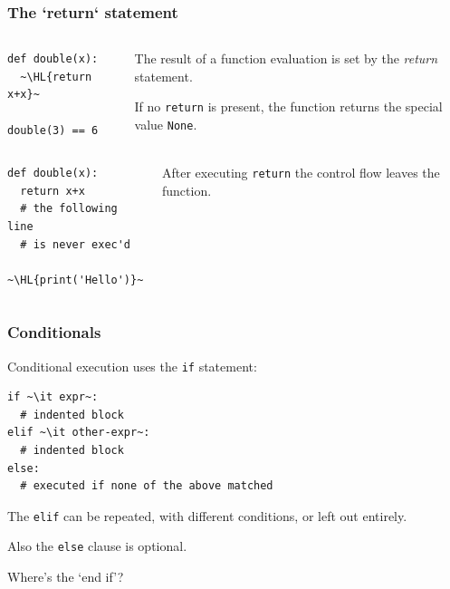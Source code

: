 \documentclass[english,serif,mathserif,xcolor=pdftex,dvipsnames,table]{beamer}
\begin{document}
\begin{frame}[fragile]
  \frametitle{The `return` statement}

  \begin{columns}
    \begin{column}{0.5\textwidth}
      \begin{lstlisting}
def double(x):
  ~\HL{return x+x}~

double(3) == 6
      \end{lstlisting}
    \end{column}
    \begin{column}{0.5\textwidth}
      \raggedleft The result of a function evaluation is set by the
      \textit{return} statement.

     \+
      If no \texttt{return} is present, the function returns the
      special value \texttt{None}.

         \end{column}
  \end{columns}
\+
  \begin{columns}
    \begin{column}{0.5\textwidth}
      \begin{lstlisting}
def double(x):
  return x+x
  # the following line
  # is never exec'd
  ~\HL{print('Hello')}~
      \end{lstlisting}
    \end{column}
    \begin{column}{0.5\textwidth}
      \raggedleft After executing \texttt{return} the control flow
      leaves the function.
    \end{column}
  \end{columns}

\end{frame}

\begin{frame}[fragile]
  \frametitle{Conditionals}
  Conditional execution uses the \texttt{if} statement:
\begin{lstlisting}
if ~\it expr~:
  # indented block
elif ~\it other-expr~:
  # indented block
else:
  # executed if none of the above matched
\end{lstlisting}

  \+The \texttt{elif} can be repeated, with different conditions, or
  left out entirely.

  \+
  Also the \texttt{else} clause is optional.

  \+
  \begin{question}
    Where's the `end if'?

  \end{question}
\end{frame}
\end{document}
